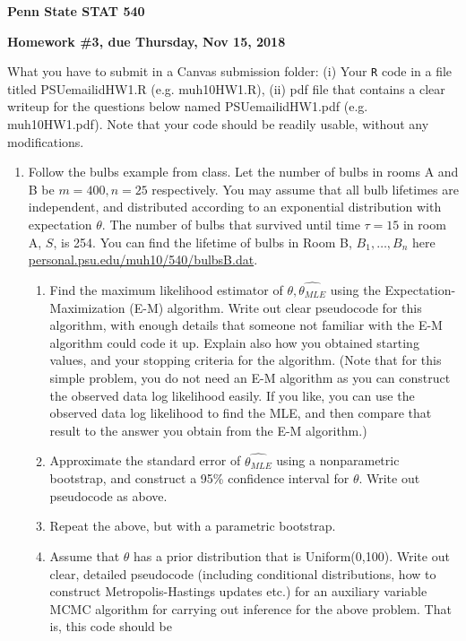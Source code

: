 \documentclass[10pt]{article}
\begin{document}
\begin{center}
{\bf Penn State STAT 540}

{\bf Homework \#3, due Thursday, Nov 15, 2018}\\

\end{center}
\noindent What you have to submit in a Canvas submission folder: (i)
Your {\tt R} code in a file titled PSUemailidHW1.R (e.g. muh10HW1.R),
(ii) pdf file that contains a clear writeup for the questions below
named PSUemailidHW1.pdf (e.g. muh10HW1.pdf). Note that
your code should be readily usable, without any modifications.
\begin{enumerate}
\item Follow the bulbs example from class. Let the number of bulbs in rooms A and B be $m=400, n=25$ respectively. You may assume that all bulb lifetimes are independent, and distributed according to an exponential distribution with expectation $\theta$. The number of bulbs that survived until time $\tau=15$ in room A, $S$, is 254. You can find the lifetime  of bulbs in Room B, $B_1,\dots, B_n$ here \url{personal.psu.edu/muh10/540/bulbsB.dat}. 
\begin{enumerate}
\item Find the maximum likelihood estimator of $\theta,
  \hat{\theta_{MLE}}$ using the Expectation-Maximization (E-M)
  algorithm. Write out clear pseudocode for this algorithm, with
  enough details that someone not familiar with the E-M algorithm
  could code it up. Explain also how you obtained starting values, and
  your stopping criteria for the algorithm. (Note that for this simple
  problem, you do not need an E-M algorithm as you can construct the
  observed data log likelihood easily. If you like, you can use the
  observed data log likelihood to find the MLE, and then compare that
  result to the answer you obtain from the E-M algorithm.)
\item Approximate the standard error of $\hat{\theta_{MLE}}$ using a
  nonparametric bootstrap, and construct a 95\% confidence interval
  for $\theta$. Write out pseudocode as above.
\item Repeat the above, but with a parametric bootstrap. 
\item Assume that $\theta$ has a prior distribution that is
  Uniform(0,100). Write out clear, detailed pseudocode (including
  conditional distributions, how to construct Metropolis-Hastings
  updates etc.) for an auxiliary variable MCMC algorithm for carrying
  out inference for the above problem. That is, this code should be

\end{enumerate}
\end{enumerate}
\end{document}
